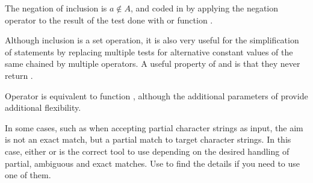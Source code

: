 \documentclass[krantz2]{krantz}\usepackage{knitr}
\begin{document}
The negation of inclusion is $a \not\in A$, and coded in \Rlang by applying the negation operator \Roperator{!} to the result of the test done with  or function .

\begin{knitrout}\footnotesize
{}\color{fgcolor}
\end{knitrout}

Although inclusion is a set operation, it is also very useful for the simplification of  statements by replacing multiple tests for alternative constant values of the same  chained by multiple \Roperator{|} operators. A useful property of  and  is that they never return .

\begin{explainbox}
Operator  is equivalent to function , although the additional parameters of  provide additional flexibility.

In some cases, such as when accepting partial character strings as input, the aim is not an exact match, but a partial match to target character strings. In this case, either  or  is the correct tool to use depending on the desired handling of partial, ambiguous and exact matches. Use  to find the details if you need to use one of them.

\end{explainbox}
\end{document}

